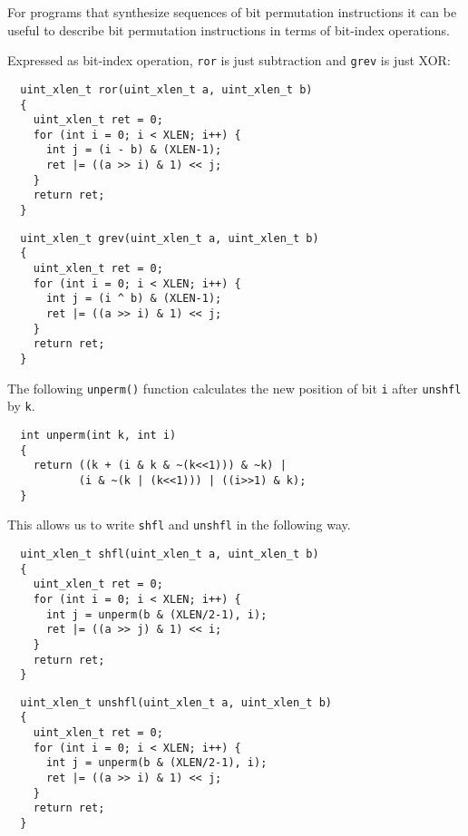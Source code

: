 For programs that synthesize sequences of bit permutation instructions it can
be useful to describe bit permutation instructions in terms of bit-index
operations.

Expressed as bit-index operation, {\tt ror} is just subtraction and {\tt grev}
is just XOR:

\begin{minipage}{\linewidth}
\begin{verbatim}
  uint_xlen_t ror(uint_xlen_t a, uint_xlen_t b)
  {
    uint_xlen_t ret = 0;
    for (int i = 0; i < XLEN; i++) {
      int j = (i - b) & (XLEN-1);
      ret |= ((a >> i) & 1) << j;
    }
    return ret;
  }
\end{verbatim}
\end{minipage}

\begin{minipage}{\linewidth}
\begin{verbatim}
  uint_xlen_t grev(uint_xlen_t a, uint_xlen_t b)
  {
    uint_xlen_t ret = 0;
    for (int i = 0; i < XLEN; i++) {
      int j = (i ^ b) & (XLEN-1);
      ret |= ((a >> i) & 1) << j;
    }
    return ret;
  }
\end{verbatim}
\end{minipage}

The following {\tt unperm()} function calculates the new position
of bit {\tt i} after {\tt unshfl} by {\tt k}.

\begin{minipage}{\linewidth}
\begin{verbatim}
  int unperm(int k, int i)
  {
    return ((k + (i & k & ~(k<<1))) & ~k) |
           (i & ~(k | (k<<1))) | ((i>>1) & k);
  }
\end{verbatim}
\end{minipage}

This allows us to write {\tt shfl} and {\tt unshfl} in the following way.

\begin{minipage}{\linewidth}
\begin{verbatim}
  uint_xlen_t shfl(uint_xlen_t a, uint_xlen_t b)
  {
    uint_xlen_t ret = 0;
    for (int i = 0; i < XLEN; i++) {
      int j = unperm(b & (XLEN/2-1), i);
      ret |= ((a >> j) & 1) << i;
    }
    return ret;
  }
\end{verbatim}
\end{minipage}

\begin{minipage}{\linewidth}
\begin{verbatim}
  uint_xlen_t unshfl(uint_xlen_t a, uint_xlen_t b)
  {
    uint_xlen_t ret = 0;
    for (int i = 0; i < XLEN; i++) {
      int j = unperm(b & (XLEN/2-1), i);
      ret |= ((a >> i) & 1) << j;
    }
    return ret;
  }
\end{verbatim}
\end{minipage}

